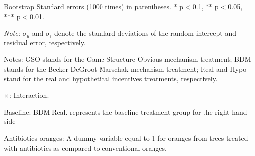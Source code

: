 \documentclass[12pt]{article}
\begin{document}
\begin{table}[H]
\begin{tablenotes}
            \footnotesize
           \item Bootstrap Standard errors (1000 times) in parentheses. * p$<$0.1, ** p$<$0.05, *** p$<$0.01.
            \item \textit{Note:} $\sigma_u$ and $\sigma_e$ denote the standard deviations of the random intercept and residual error, respectively.
            \item Notes: GSO stands for the Game Structure Obvious mechanism treatment; BDM stands for the Becker-DeGroot-Marschak mechanism treatment; Real and Hypo stand for the real and hypothetical incentives treatments, respectively.
           \item $\times$: Interaction.
           \item Baseline: BDM Real. represents the baseline treatment group for the right hand-side 
           \item Antibiotics oranges: A dummy variable equal to 1 for oranges from trees treated with antibiotics as compared to conventional oranges.
        \end{tablenotes}
\end{table}
\end{document}
